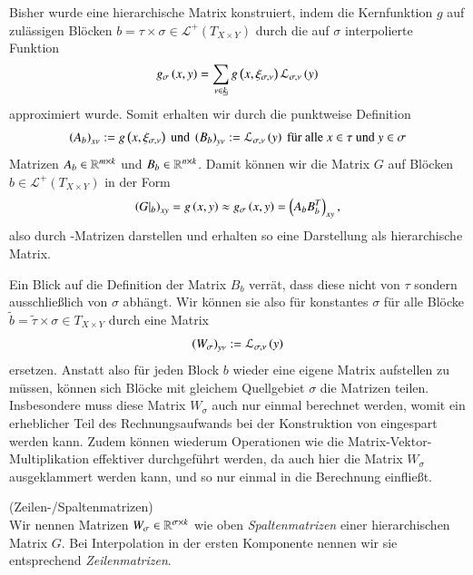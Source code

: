     Bisher wurde eine hierarchische Matrix konstruiert, indem die Kernfunktion $g$ auf zulässigen Blöcken $b = \tau \times \sigma \in \mathcal{L}^+\left(T_{X \times Y}\right)$ durch die auf $\sigma$ 
    interpolierte Funktion
    \begin{equation*}
      g_\sigma\left(x, y\right) = \sum_{\nu \in \haken{k}} g\left(x, \xi_\inds{\nu}\right) \lag_\inds{\nu}\left(y\right)
    \end{equation*}
    approximiert wurde. Somit erhalten wir durch die punktweise Definition
    \begin{equation*}
      \left(A_b\right)_{x\nu} := g\left(x, \xi_{\sigma, \nu}\right) \text{ und } \left(B_b\right)_{y\nu} := \mathcal{L}_{\sigma, \nu}\left(y\right) \text{ für alle } x \in \tau \text{ und } y \in \sigma
    \end{equation*}
    Matrizen $A_b \in \mathbb{R}^{m \times k}$ und $B_b \in \mathbb{R}^{n \times k}$. Damit können wir die Matrix $G$ auf Blöcken $b \in \mathcal{L}^+\left(T_{X \times Y}\right)$ in der Form 
    \begin{equation*}
      \left(G|_b\right)_{xy} = g\left(x,y\right) \approx g_\sigma\left(x,y\right) = \left(A_b B_b^T\right)_{xy},
    \end{equation*}
    also durch \Rk-Matrizen darstellen und erhalten so eine Darstellung als hierarchische Matrix. \citep{nichtlokop}
    
    Ein Blick auf die Definition der Matrix $B_b$ verrät, dass diese nicht von $\tau$ sondern ausschließlich von $\sigma$ abhängt. Wir können sie also für konstantes $\sigma$ für alle Blöcke 
    $\tilde b = \tilde \tau \times \sigma \in T_{X \times Y}$ durch eine Matrix
    \begin{equation*}
      \left(W_\sigma\right)_{y\nu} := \mathcal{L}_{\sigma, \nu}\left(y\right)
    \end{equation*} 
    ersetzen. Anstatt also für jeden Block $b$ wieder eine eigene Matrix aufstellen zu müssen, können sich Blöcke mit gleichem Quellgebiet $\sigma$ die Matrizen teilen. Insbesondere muss diese 
    Matrix $W_\sigma$ auch nur einmal berechnet werden, womit ein erheblicher Teil des Rechnungsaufwands bei der Konstruktion von \hmat eingespart werden kann. Zudem können wiederum Operationen
    wie die Matrix-Vektor-Multiplikation effektiver durchgeführt werden, da auch hier die Matrix $W_\sigma$ ausgeklammert werden kann, und so nur einmal in die Berechnung einfließt. \citep{nichtlokop}
    
    \begin{defn}
      (Zeilen-/Spaltenmatrizen)\\
      Wir nennen Matrizen $W_\sigma \in \mathbb{R}^{\sigma \times k}$ wie oben \textit{Spaltenmatrizen} einer hierarchischen Matrix $G$. Bei Interpolation in der ersten Komponente nennen wir sie 
      entsprechend \textit{Zeilenmatrizen}.
    \end{defn}

